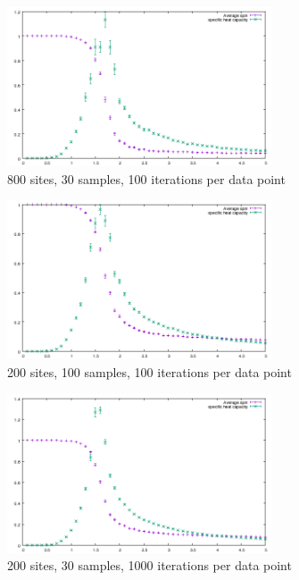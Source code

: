 \documentclass{article}
\begin{document}
\begin{figure}[H]
  \centering
  \includegraphics[width = 0.7\textwidth]{figures/800_sites_100_iterations_30_samples.png}
  \caption{800 sites, 30 samples, 100 iterations per data point}
  \label{fig:20_30_100}
\end{figure}

\begin{figure}[H]
  \centering
  \includegraphics[width = 0.7\textwidth]{figures/200_sites_100_iterations_100_samples.png}
  \caption{200 sites, 100 samples, 100 iterations per data point}
  \label{fig:10_100_100}
\end{figure}


\begin{figure}[H]
  \centering
  \includegraphics[width = 0.7\textwidth]{figures/200_sites_1000_iterations_30_samples.png}
  \caption{200 sites, 30 samples, 1000 iterations per data point}
  \label{fig:10_30_1000}
\end{figure}
\end{document}
